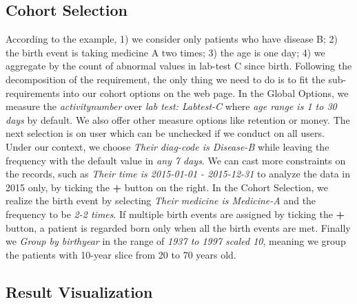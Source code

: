 \documentclass[10pt,conference,letterpaper]{IEEEtran}
\begin{document}
\subsection{Cohort Selection}

According to the example, 1) we consider only patients who have disease B; 2) the birth event is taking medicine A two times; 3) the age is one day; 4) we aggregate by the count of abnormal values in lab-test C since birth. Following the decomposition of the requirement, the only thing we need to do is to fit the sub-requirements into our cohort options on the web page. In the Global Options, we measure the \emph{activity\textunderscore number} over \emph{lab test: Labtest-C} where \emph{age range is 1 to 30 days} by default. We also offer other measure options like retention or money. The next selection is on user which can be unchecked if we conduct on all users. Under our context, we choose \emph{Their diag-code is Disease-B} while leaving the frequency with the default value in \emph{any 7 days}. We can cast more constraints on the records, such as \emph{Their time is 2015-01-01 - 2015-12-31} to analyze the data in 2015 only, by ticking the \textbf{+} button on the right. In the Cohort Selection, we realize the birth event by selecting \emph{Their medicine is Medicine-A} and the frequency to be \emph{2-2 times}. If multiple birth events are assigned by ticking the \textbf{+} button, a patient is regarded born only when all the birth events are met. Finally we \emph{Group by birthyear} in the range of \emph{1937 to 1997 scaled 10}, meaning we group the patients with 10-year slice from 20 to 70 years old.

\subsection{Result Visualization}
\end{document}

